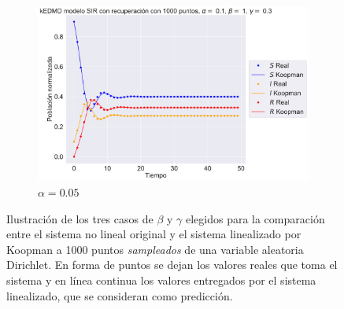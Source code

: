 \begin{figure}[htbp]
\begin{subfigure}[b]{0.45\textwidth}
        \label{fig:image2}
    \end{subfigure}
    \hfill
    \begin{subfigure}[b]{0.45\textwidth}
        \centering
        \includegraphics[width=\textwidth]{img/content/chapter3/SIR_rec3.pdf}
        \caption{$\alpha=0.05$}
    \end{subfigure}
    \caption{Ilustración de los tres casos de $\beta$ y $\gamma$ elegidos para la comparación entre el sistema no lineal original y el sistema linealizado por Koopman a 1000 puntos \textit{sampleados} de una variable aleatoria Dirichlet. En forma de puntos se dejan los valores reales que toma el sistema y en línea continua los valores entregados por el sistema linealizado, que se consideran como predicción.}
    \label{fig:Comp_traj_SIR}
\end{figure}
